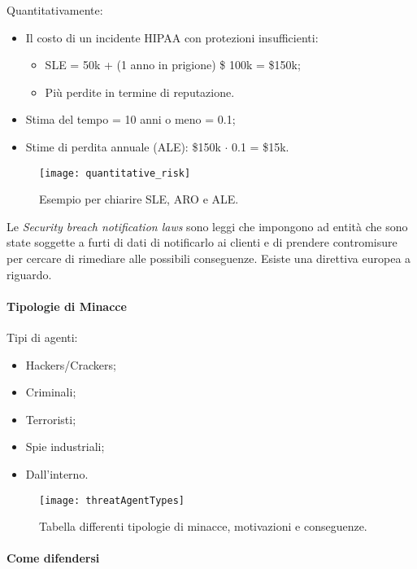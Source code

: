 
Quantitativamente:
\begin{itemize}
\item Il costo di un incidente HIPAA con protezioni insufficienti:
\begin{itemize}
 \item SLE = 50k + (1 anno in prigione) \$ 100k = \$150k;
 \item Più perdite in termine di reputazione.
\end{itemize}
\item Stima del tempo = 10 anni o meno = 0.1;
\item Stime di perdita annuale (ALE): \$150k $\cdot$ 0.1 = \$15k.
\end{itemize}


\begin{figure}[H]
 \centering
 \texttt{[image: quantitative\_risk]}
 \caption{Esempio per chiarire SLE, ARO e ALE.}
\end{figure}

Le \textit{Security breach notification laws} sono leggi che impongono ad
entità che sono state soggette a furti di dati di notificarlo ai clienti e di
prendere contromisure per cercare di rimediare alle possibili conseguenze.
Esiste una direttiva europea a riguardo.


\paragraph*{Tipologie di Minacce}

Tipi di agenti:
\begin{itemize}
\item Hackers/Crackers;
\item Criminali;
\item Terroristi;
\item Spie industriali;
\item Dall'interno.
\end{itemize}

\begin{figure}[H]
 \centering
 \texttt{[image: threatAgentTypes]}
 \caption{Tabella differenti tipologie di minacce, motivazioni e conseguenze.}
\end{figure}


\paragraph*{Come difendersi}

